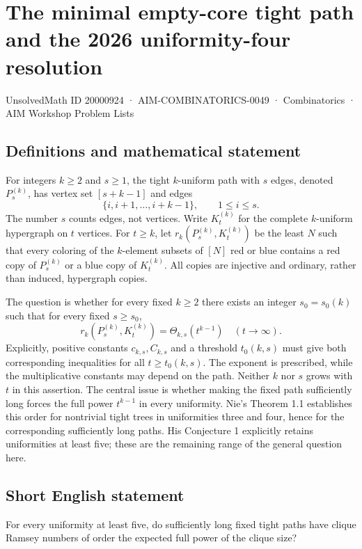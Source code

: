 \documentclass[11pt,a4paper]{article}
\begin{document}
\section*{The minimal empty-core tight path and the 2026 uniformity-four resolution}\label{20000924}
{\small UnsolvedMath ID 20000924 · AIM-COMBINATORICS-0049 · Combinatorics · AIM Workshop Problem Lists}
\subsection{Definitions and mathematical statement}
For integers $k\ge2$ and $s\ge1$, the tight $k$-uniform path with
$s$ edges, denoted $P_s^{(k)}$, has vertex set $[s+k-1]$ and edges
\[
             \{i,i+1,\ldots,i+k-1\},\qquad 1\le i\le s.
\]
The number $s$ counts edges, not vertices. Write $K_t^{(k)}$ for the
complete $k$-uniform hypergraph on $t$ vertices. For $t\ge k$, let
$r_k(P_s^{(k)},K_t^{(k)})$ be the least $N$ such that every coloring
of the $k$-element subsets of $[N]$ red or blue contains a red copy of
$P_s^{(k)}$ or a blue copy of $K_t^{(k)}$. All copies are injective
and ordinary, rather than induced, hypergraph copies.

The question is whether for every fixed $k\ge2$ there exists an integer
$s_0=s_0(k)$ such that for every fixed $s\ge s_0$,
\[
               r_k(P_s^{(k)},K_t^{(k)})=\Theta_{k,s}(t^{k-1})
                       \quad(t\to\infty).
\]
Explicitly, positive constants $c_{k,s},C_{k,s}$ and a threshold
$t_0(k,s)$ must give both corresponding inequalities for all
$t\ge t_0(k,s)$. The exponent is prescribed, while the multiplicative
constants may depend on the path. Neither $k$ nor $s$ grows with $t$
in this assertion. The central issue is whether making the fixed path
sufficiently long forces the full power $t^{k-1}$ in every uniformity.
Nie's Theorem 1.1 establishes this order for nontrivial tight trees in
uniformities three and four, hence for the corresponding sufficiently
long paths. His Conjecture 1 explicitly retains uniformities at least
five; these are the remaining range of the general question here.
\subsection{Short English statement}
For every uniformity at least five, do sufficiently long fixed tight paths have clique Ramsey numbers of order the expected full power of the clique size?
\end{document}
